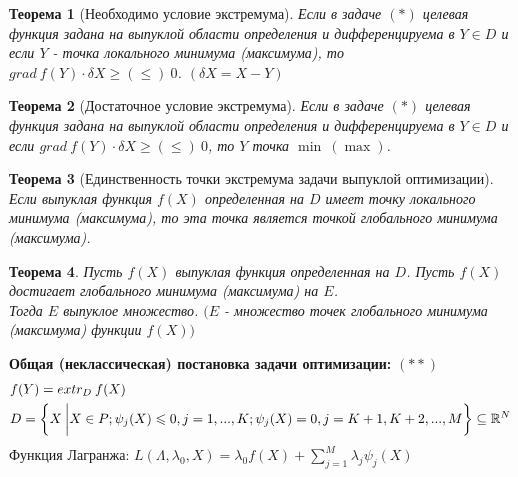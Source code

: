 \documentclass[12pt]{article}
\newtheorem{theorem}{Теорема}[subsection]
\theoremstyle{definition}
\theoremstyle{remark}
\begin{document}
\begin{theorem}[Необходимо условие экстремума]
Если в задаче $(*)$ целевая функция задана на выпуклой области определения и дифференцируема в $Y\in D$ и если $Y$ - точка локального минимума (максимума), то $grad\:f(Y)\cdot\delta X\geqslant(\leqslant)\:0$. $(\delta X=X-Y)$
\end{theorem}
\begin{theorem}[Достаточное условие экстремума]
Если в задаче $(*)$ целевая функция задана на выпуклой области определения и дифференцируема в $Y\in D$ и если $grad \:f(Y)\cdot\delta X\geqslant(\leqslant)\:0$, то  $Y$ точка $\min\: (\max)$.
\end{theorem}
\begin{theorem}[Единственность точки экстремума задачи выпуклой оптимизации]
  Если выпуклая функция $f(X)$ определенная на $D$ имеет точку локального минимума (максимума), то эта точка является точкой глобального минимума (максимума).
\end{theorem}
\begin{theorem}
  Пусть $f(X)$ выпуклая функция определенная на $D$. Пусть $f(X)$ достигает глобального минимума (максимума) на $E$.\\
  Тогда $E$ выпуклое множество. $(E$ - множество точек глобального минимума (максимума) функции $f(X))$
\end{theorem}
\textbf{Общая (неклассическая) постановка задачи оптимизации: }$(**)$
\begin{align}
   &f(Y)=extr_D\:f(X)\notag\\
   &D=\bigg\{ X\:\bigg|X\in P; \psi_j(X)\leqslant 0,j=1,...,K;\psi_j(X)= 0,j=K+1,K+2,...,M \bigg\}\subseteq \mathbb{R}^N\notag\\
\end{align}
Функция Лагранжа: $\displaystyle L(\Lambda,\lambda_0,X)=\lambda_0f(X)+\sum_{j=1}^M\lambda_j\psi_j(X)$
\end{document}
